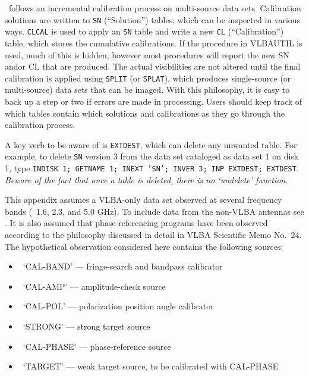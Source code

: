 
\AIPS\ follows an incremental calibration process on multi-source data
sets.  Calibration solutions are written to {\tt SN} (``Solution'')
tables, which can be inspected in various ways.  {\tt CLCAL} is used
to apply an {\tt SN} table and write a new {\tt CL} (``Calibration'')
table, which stores the cumulative calibrations.   If the procedure in
VLBAUTIL is used, much of this is hidden, however most procedures will
report the new SN and\/or CL that are produced.  The actual
visibilities are not altered until the final calibration is applied
using {\tt SPLIT} (or {\tt SPLAT}), which produces single-source
(or multi-source) data sets that can be imaged.  With this philosophy,
it is easy to back up a step or two if errors are made in processing.
Users should keep track of which tables contain which solutions and
calibrations as they go through the calibration process.

A key verb to be aware of is {\tt EXTDEST}, which can delete any
unwanted table.  For example, to delete {\tt SN} version 3 from the
data set cataloged as data set 1 on disk 1, type {\tt INDISK 1;
GETNAME 1; INEXT 'SN'; INVER 3; INP EXTDEST; EXTDEST}\@.  {\it Beware
of the fact that once a table is deleted, there is no `undelete'
function.}


This appendix assumes a VLBA-only data set observed at several
frequency bands (\eg\ 1.6, 2.3, and 5.0 GHz).  To include data from
the non-VLBA antennas see \@.  It is also assumed that
phase-referencing programs have been observed according to the
philosophy discussed in detail in VLBA Scientific Memo No.~24.  The
hypothetical observation considered here contains the following
sources:

\begin{itemize}
\item\ {`CAL-BAND' --- fringe-search and bandpass calibrator}
\parskip 0pt
\item\ {`CAL-AMP' --- amplitude-check source}
\item\ {`CAL-POL' --- polarization position angle calibrator}
\item\ {`STRONG' --- strong target source}
\item\ {`CAL-PHASE' --- phase-reference source}
\item\ {`TARGET' --- weak target source, to be calibrated with CAL-PHASE}
\end{itemize}

